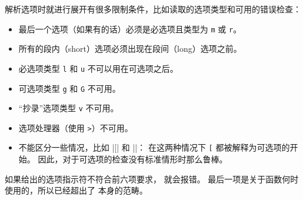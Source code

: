 \documentclass{l3doc}
\begin{document}
\begin{function}
解析选项时就进行展开有很多限制条件，比如读取的选项类型和可用的错误检查：
\begin{itemize}
    \item 最后一个选项（如果有的话）必须是必选项且类型为 \texttt{m} 或 \texttt{r}。
    \item 所有的段内（short）选项必须出现在段间（long）选项之前。
    \item 必选项类型 \texttt{l} 和 \texttt{u} 不可以用在可选项之后。
    \item 可选项类型 \texttt{g} 和 \texttt{G} 不可用。
    \item “抄录”选项类型 \texttt{v} 不可用。
    \item 选项处理器（使用 \texttt{>}）不可用。
    \item 不能区分一些情况，比如 |\foo[| 和 |\foo{[}|：
    在这两种情况下 \texttt{[} 都被解释为可选项的开始。
    因此，对于可选项的检查没有标准情形时那么鲁棒。
\end{itemize}
如果给出的选项指示符不符合前六项要求， 就会报错。
最后一项是关于函数何时使用的，所以已经超出了  本身的范畴。
%
\end{function}
\end{document}
